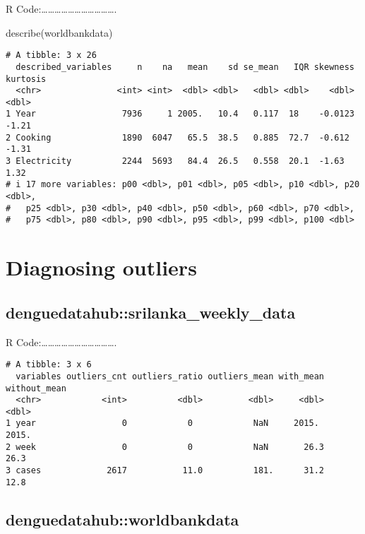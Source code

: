 \documentclass[
  letterpaper,
  DIV=11,
  numbers=noendperiod]{scrreprt}
\newenvironment{Shaded}{\begin{snugshade}}{\end{snugshade}}
\newcommand{\FunctionTok}[1]{\textcolor[rgb]{0.28,0.35,0.67}{#1}}
\newcommand{\NormalTok}[1]{\textcolor[rgb]{0.00,0.23,0.31}{#1}}
\begin{document}
R
Code:\ldots\ldots\ldots\ldots\ldots\ldots\ldots\ldots\ldots\ldots\ldots.

\begin{Shaded}
\begin{Highlighting}[]
\FunctionTok{describe}\NormalTok{(worldbankdata)}
\end{Highlighting}
\end{Shaded}

\begin{verbatim}
# A tibble: 3 x 26
  described_variables     n    na   mean    sd se_mean   IQR skewness kurtosis
  <chr>               <int> <int>  <dbl> <dbl>   <dbl> <dbl>    <dbl>    <dbl>
1 Year                 7936     1 2005.   10.4   0.117  18    -0.0123    -1.21
2 Cooking              1890  6047   65.5  38.5   0.885  72.7  -0.612     -1.31
3 Electricity          2244  5693   84.4  26.5   0.558  20.1  -1.63       1.32
# i 17 more variables: p00 <dbl>, p01 <dbl>, p05 <dbl>, p10 <dbl>, p20 <dbl>,
#   p25 <dbl>, p30 <dbl>, p40 <dbl>, p50 <dbl>, p60 <dbl>, p70 <dbl>,
#   p75 <dbl>, p80 <dbl>, p90 <dbl>, p95 <dbl>, p99 <dbl>, p100 <dbl>
\end{verbatim}

\section{Diagnosing outliers}\label{diagnosing-outliers}

\subsection{denguedatahub::srilanka\_weekly\_data}\label{denguedatahubsrilanka_weekly_data-6}

R
Code:\ldots\ldots\ldots\ldots\ldots\ldots\ldots\ldots\ldots\ldots\ldots.

\begin{verbatim}
# A tibble: 3 x 6
  variables outliers_cnt outliers_ratio outliers_mean with_mean without_mean
  <chr>            <int>          <dbl>         <dbl>     <dbl>        <dbl>
1 year                 0            0            NaN     2015.        2015. 
2 week                 0            0            NaN       26.3         26.3
3 cases             2617           11.0          181.      31.2         12.8
\end{verbatim}

\subsection{denguedatahub::worldbankdata}\label{denguedatahubworldbankdata-1}
\end{document}
